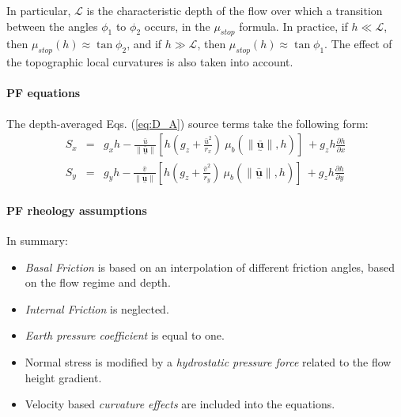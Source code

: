 \documentclass{article}
\begin{document}
In particular, $\mathcal{L}$ is the characteristic depth of the flow over which a transition between the angles $\phi_{1}$ to $\phi_{2}$ occurs, in the $\mu_{stop}$ formula. In practice, if $h\ll \mathcal L$, then $\mu_{stop}(h)\approx \tan\phi_{2}$, and if $h\gg \mathcal L$, then $\mu_{stop}(h)\approx\tan\phi_{1}$. The effect of the topographic local curvatures is also taken into account.

\paragraph{PF equations} The depth-averaged Eqs. (\ref{eq:D_A}) source terms take the following form:
\begin{eqnarray}\label{eq:S_Pouliquen}
S_{x} &=&  g_{x} h -  \frac{\bar{u}}{\| \underset{^\sim}{\bar{\textbf{u}}} \|}\left[h \left(g_z+\frac{\bar{u}^2}{r_x}\right) \ \mu_{b}(\|\underset{^\sim}{\bar{\textbf{u}}} \| , h)\right] \ + g_{z}h\frac{\partial h}{\partial x} \nonumber \\
S_{y} &=&  g_{y} h - \frac{\bar{v}}{\| \underset{^\sim}{\bar{\textbf{u}}} \|}\left[h \left(g_z +\frac{\bar{v}^2}{r_y}\right) \ \mu_{b}(\|\underset{^\sim}{\bar{\textbf{u}}} \| , h)\right] \ + g_{z}h\frac{\partial h}{\partial y}
\end{eqnarray}

\paragraph{PF rheology assumptions} In summary:
\begin{itemize}
\item \textit{Basal Friction} is based on an interpolation of different friction angles, based on the flow regime and depth.

\item \textit{Internal Friction} is neglected.

\item \textit{Earth pressure coefficient} is equal to one.

\item Normal stress is modified by a \textit{hydrostatic pressure force} related to the flow height gradient.

\item Velocity based \textit{curvature effects} are included into the equations.
\end{itemize}
\end{document}
